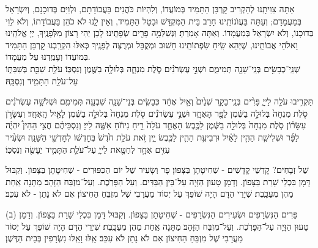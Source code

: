 \documentclass[twoside, openany, parskip=half, 11pt]{book}
\begin{document}
 אַתָּה צִוִּיתָֽנוּ לְהַקְרִיב קׇרְבַּן הַתָּמִיד בְּמוֹעֲדוֹ, וְלִהְיוֹת כֹּהֲנִים בַּעֲבוֹדָתָם, וּלְוִיִּם בְּדוּכָנָם, וְיִשְׂרָאֵל בְּמַעֲמָדָם; וְעַתָּה בַּעֲוֺנוֹתֵֽינוּ חָרֵב בֵּית הַמִּקְדָּשׁ וּבָטֵל הַתָּמִיד, וְאֵין לָֽנוּ לֹא כֹהֵן בַּעֲבוֹדָתוֹ, וְלֹא לֵוִי בְּדוּכָנוֹ, וְלֹא יִשְׂרָאֵל בְּמַעֲמָדוֹ. וְאַתָּה אָמַרְתָּ׃ וּֽנְשַׁלְּמָ֥ה  פָרִ֖ים שְׂפָתֵֽינוּ׃ לָכֵן יְהִי רָצוֹן מִלְּפָנֶֽיךָ, יְיָ אֱלֹהֵֽינוּ וֵאלֹהֵי אֲבוֹתֵֽינוּ, שֶׁיְּהֵא שִֽׂיחַ שִׂפְתוֹתֵֽינוּ חָשׁוּב וּמְקֻבָּל וּמְרֻצֶּה לְפָנֶֽיךָ כְּאִלּוּ הִקְרַֽבְנוּ קׇרְבַּן הַתָּמִיד בְּמוֹעֲדוֹ וְעָמַֽדְנוּ עַל מַעֲמָדוֹ.\\
\shabbos
{}
שְׁנֵֽי־כְבָשִׂ֥ים בְּנֵֽי־שָׁנָ֖ה תְּמִימִ֑ם וּשְׁנֵ֣י עֶשְׂרֹנִ֗ים סֹ֧לֶת מִנְחָ֛ה בְּלוּלָ֥ה בַשֶּׁ֖מֶן וְנִסְכּֽוֹ׃
עֹלַ֥ת שַׁבַּ֖ת בְּשַׁבַּתּ֑וֹ עַל־עֹלַ֥ת הַתָּמִ֖יד וְנִסְכָּֽהּ׃


תַּקְרִ֥יבוּ עֹלָ֖ה לַייָ֑ פָּרִ֨ים בְּנֵֽי־בָקָ֤ר שְׁנַ֙יִם֙ וְאַ֣יִל אֶחָ֔ד כְּבָשִׂ֧ים בְּנֵי־שָׁנָ֛ה שִׁבְעָ֖ה תְּמִימִֽם׃
וּשְׁלֹשָׁ֣ה עֶשְׂרֹנִ֗ים סֹ֤לֶת מִנְחָה֙ בְּלוּלָ֣ה בַשֶּׁ֔מֶן לַפָּ֖ר הָאֶחָ֑ד וּשְׁנֵ֣י עֶשְׂרֹנִ֗ים סֹ֤לֶת מִנְחָה֙ בְּלוּלָ֣ה בַשֶּׁ֔מֶן לָאַ֖יִל הָֽאֶחָֽד׃
וְעִשָּׂרֹ֣ן עִשָּׂר֗וֹן סֹ֤לֶת מִנְחָה֙ בְּלוּלָ֣ה בַשֶּׁ֔מֶן לַכֶּ֖בֶשׂ הָאֶחָ֑ד עֹלָה֙ רֵ֣יחַ נִיחֹ֔חַ אִשֶּׁ֖ה לַייָ׃
וְנִסְכֵּיהֶ֗ם חֲצִ֣י הַהִין֩ יִהְיֶ֨ה לַפָּ֜ר וּשְׁלִישִׁ֧ת הַהִ֣ין לָאַ֗יִל וּרְבִיעִ֥ת הַהִ֛ין לַכֶּ֖בֶשׂ יָ֑יִן זֹ֣את עֹלַ֥ת חֹ֙דֶשׁ֙ בְּחׇדְשׁ֔וֹ לְחׇדְשֵׁ֖י הַשָּׁנָֽה׃
וּשְׂעִ֨יר עִזִּ֥ים אֶחָ֛ד לְחַטָּ֖את לַייָ֑ עַל־עֹלַ֧ת הַתָּמִ֛יד יֵעָשֶׂ֖ה וְנִסְכּֽוֹ׃

%
שֶׁל זְבָחִים? קׇדְשֵׁי קׇדָשִׁים - שְׁחִיטָתָן בַּצָּפוֹן׃ פָּר וְשָׂעִיר שֶׁל יוֹם הַכִּפּוּרִים - שְׁחִיטָתָן בַּצָּפוֹן. וְקִבּוּל דָּמָן בִּכְלֵי שָׁרֵת בַּצָּפוֹן. וְדָמָן טָעוּן הַזָּיָה עַל־בֵּין הַבַּדִּים. וְעַל הַפָּרֹֽכֶת. וְעַל־מִזְבַּח הַזָּהָב׃ מַתָּנָה אַֽחַת מֵהֶן מְעַכָּֽבֶת׃ שְׁיָרֵי הַדָּם הָיָה שׁוֹפֵךְ עַל יְסוֹד מַעֲרָבִי שֶׁל מִזְבֵּחַ הַחִיצוֹן׃ אִם לֹא נָתַן - לֹא עִכֵּב׃

(ב) פָּרִים הַנִּשְׂרָפִים וּשְׂעִירִים הַנִּשְׂרָפִים - שְׁחִיטָתָן בַּצָּפוֹן. וְקִבּוּל דָּמָן בִּכְלִי שָׁרֵת בַּצָּפוֹן. וְדָמָן טָעוּן הַזָּיָה עַל־הַפָּרֹֽכֶת. וְעַל־מִזְבַּח הַזָּהָב׃ מַתָּנָה אַֽחַת מֵהֶן מְעַכָּֽבֶת׃ שִׁיְרֵי הַדָּם הָיָה שׁוֹפֵךְ עַל יְסוֹד מַעֲרָבִי שֶׁל מִזְבֵּחַ הַחִיצוֹן אִם לֹא נָתַן לֹא עִכֵּב׃ אֵֽלּוּ וָאֵֽלּוּ נִשְׂרָפִין בְּבֵית הַדֶּשֶׁן׃
\end{document}
